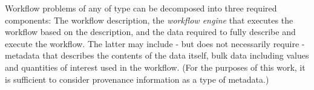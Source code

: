 Workflow problems of any of type can be decomposed into three required
components: The workflow description, the \textit{workflow engine} that
executes the workflow based on the description, and the data required to fully
describe and execute the workflow. The latter may include - but does not
necessarily require - metadata that describes the contents of the data itself,
bulk data including values and quantities of interest used in the workflow.
(For the purposes of this work, it is sufficient to consider provenance
information as a type of metadata.)